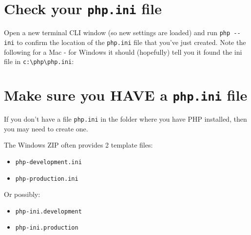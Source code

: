 \documentclass[a4paperpaper,openright]{book}
\newenvironment{Shaded}{}{}
\newcommand{\ExtensionTok}[1]{#1}
\newcommand{\NormalTok}[1]{#1}
\providecommand{\tightlist}{%
  \setlength{\itemsep}{0pt}\setlength{\parskip}{0pt}}
\begin{document}
\hypertarget{check-your-php.ini-file}{%
\section{\texorpdfstring{Check your \texttt{php.ini}
file}{Check your php.ini file}}\label{check-your-php.ini-file}}

Open a new terminal CLI window (so new settings are loaded) and run
\texttt{php\ -\/-ini} to confirm the location of the \texttt{php.ini}
file that you've just created. Note the following for a Mac - for
Windows it should (hopefully) tell you it found the ini file in
\texttt{c:\textbackslash{}php\textbackslash{}php.ini}:

\begin{Shaded}
\end{Shaded}

\hypertarget{make-sure-you-have-a-php.ini-file}{%
\section{\texorpdfstring{Make sure you HAVE a \texttt{php.ini}
file}{Make sure you HAVE a php.ini file}}\label{make-sure-you-have-a-php.ini-file}}

If you don't have a file \texttt{php.ini} in the folder where you have
PHP installed, then you may need to create one.

The Windows ZIP often provides 2 template files:

\begin{itemize}
\tightlist
\item
  \texttt{php-development.ini}
\item
  \texttt{php-production.ini}
\end{itemize}

Or possibly:

\begin{itemize}
\tightlist
\item
  \texttt{php-ini.development}
\item
  \texttt{php-ini.production}
\end{itemize}
\end{document}
